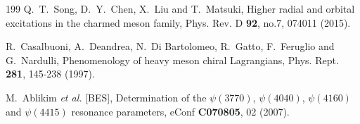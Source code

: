 \documentclass[prl,twocolumn,floatfix,amsmath,nofootinbib,amssymb,floatfix]{revtex4}
\begin{document}
\begin{thebibliography}{199}
Q.~T.~Song, D.~Y.~Chen, X.~Liu and T.~Matsuki,
Higher radial and orbital excitations in the charmed meson family,
Phys. Rev. D \textbf{92}, no.7, 074011 (2015).


R.~Casalbuoni, A.~Deandrea, N.~Di Bartolomeo, R.~Gatto, F.~Feruglio and G.~Nardulli,
Phenomenology of heavy meson chiral Lagrangians,
Phys. Rept. \textbf{281}, 145-238 (1997).


M.~Ablikim \textit{et al.} [BES],
Determination of the $\psi(3770)$, $\psi(4040)$, $\psi(4160)$ and $\psi(4415)$ resonance parameters,
eConf \textbf{C070805}, 02 (2007).


\end{thebibliography}
\end{document}
